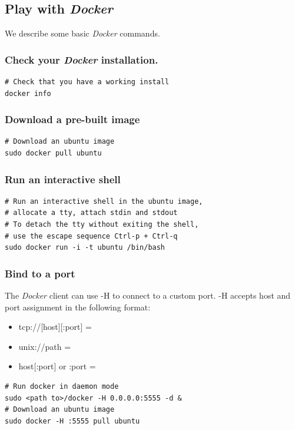 \documentclass[11pt]{article}
\begin{document}
\subsection{Play with \emph{Docker}}
\label{sec-2-3}

We describe some basic \emph{Docker} commands.
\subsubsection{Check your \emph{Docker} installation.}
\label{sec-2-3-1}


\begin{verbatim}
# Check that you have a working install
docker info
\end{verbatim}
\subsubsection{Download a pre-built image}
\label{sec-2-3-2}


\begin{verbatim}
# Download an ubuntu image
sudo docker pull ubuntu
\end{verbatim}
\subsubsection{Run an interactive shell}
\label{sec-2-3-3}


\begin{verbatim}
# Run an interactive shell in the ubuntu image,
# allocate a tty, attach stdin and stdout
# To detach the tty without exiting the shell,
# use the escape sequence Ctrl-p + Ctrl-q
sudo docker run -i -t ubuntu /bin/bash
\end{verbatim}
\subsubsection{Bind to a port}
\label{sec-2-3-4}

The \emph{Docker} client can use -H to connect to a custom port.
-H accepts host and port assignment in the following format: 
\begin{itemize}
\item tcp://[host][:port]  =
\item unix://path =
\item host[:port] or :port =
\end{itemize}


\begin{verbatim}
# Run docker in daemon mode
sudo <path to>/docker -H 0.0.0.0:5555 -d &
# Download an ubuntu image
sudo docker -H :5555 pull ubuntu
\end{verbatim}
\end{document}
